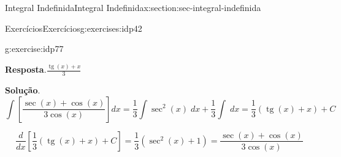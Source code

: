 \documentclass[oneside,10pt,]{article}
\newcommand{\blocktitlefont}{\relax}
\numberwithin{equation}{section}
\DeclareMathOperator{\tan}{tg}
\begin{document}
\begin{sectionptx}{Integral Indefinida}{}{Integral Indefinida}{}{}{x:section:sec-integral-indefinida}
\begin{exercises-subsection}{Exercícios}{}{Exercícios}{}{}{g:exercises:idp42}
\begin{divisionexercise}{12}{}{}{g:exercise:idp77}
\par\smallskip%
\noindent\textbf{\blocktitlefont Resposta}.\hypertarget{g:answer:idp78}{}\quad{}\(\frac{\tan\!\left(x\right)+x}{3}\)%
\par\smallskip%
\noindent\textbf{\blocktitlefont Solução}.\hypertarget{g:solution:idp79}{}\quad{}%
\begin{equation*}
\displaystyle \int \left [\frac{\sec\!\left(x\right)+\cos\!\left(x\right)}{3\cos\!\left(x\right)} \right] dx= \frac{1}{3}\int  \sec^{2}\!\left(x\right)  \;dx+\frac{1}{3}\int    \;dx= \frac{1}{3}\left(\tan\!\left(x\right)+x\right)+C
\end{equation*}
%
\par
%
\begin{equation*}
\frac{d}{dx}\left[\frac{1}{3}\left(\tan\!\left(x\right)+x\right)+C\right]=\frac{1}{3}\left(\sec^{2}\!\left(x\right)+1\right)=\frac{\sec\!\left(x\right)+\cos\!\left(x\right)}{3\cos\!\left(x\right)}
\end{equation*}
%
\end{divisionexercise}%
\end{exercises-subsection}
\end{sectionptx}
%
%
\typeout{************************************************}
\typeout{************************************************}
%
\end{document}
